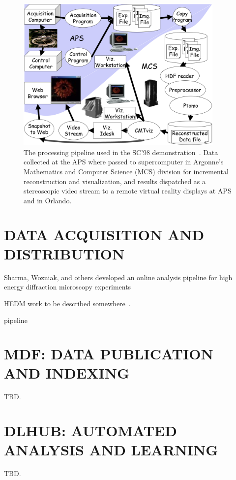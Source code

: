 \documentclass{aip-cp}
\newcommand\ian[1]{}
\newcommand\ian[1]{{\color{red}[Ian: #1]}}
\begin{document}
\begin{figure}[h]
  \centerline{\includegraphics[width=4in]{Figs/APS-Fig.png}}
  \caption{The processing pipeline used in the SC'98 demonstration~\cite{von2000real}. Data collected at the APS 
  where passed to supercomputer in Argonne's Mathematics and Computer Science (MCS) division for
  incremental reconstruction and visualization, and results dispatched as a stereoscopic
  video stream to a remote virtual reality displays at APS and in Orlando.\label{fig:sc98}}
\end{figure}

\section{DATA ACQUISITION AND DISTRIBUTION}

Sharma, Wozniak, and others developed an online analysis pipeline for high energy diffraction microscopy
experiments 

HEDM work to be described somewhere~\cite{park2015high}.

pipeline~\cite{wozniak2015big}


\ian{Petrel should get a mention.}



\section{MDF: DATA PUBLICATION AND INDEXING}

TBD.


\section{DLHUB: AUTOMATED ANALYSIS AND LEARNING}

TBD.
\end{document}
